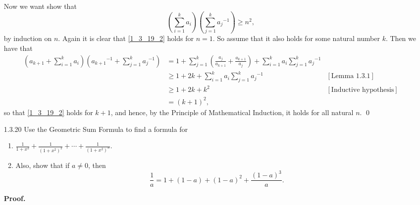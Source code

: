 \begin{enumerate}
      Now we want show that
      \begin{equation}
         \left(\sum_{i = 1}^ka_i\right)
         \left(\sum_{j = 1}^k{a_j}^{-1}\right) \ge n^2, \label{1_3_19_2}
      \end{equation}
      by induction on $n$. Again it is clear that \eqref{1_3_19_2} holds for
      $n = 1$. So assume that it also holds for some natural number $k$. Then
      we have that
      \begin{align*}
         \left(a_{k+1} + \sum_{i = 1}^ka_i\right)
         \left({a_{k+1}}^{-1} + \sum_{j = 1}^k{a_j}^{-1}\right)
            &= 1 + \sum_{j = 1}^k\left(\frac{a_j}{a_{k+1}} +
               \frac{a_{k+1}}{a_j}\right) + \sum_{i = 1}^ka_i
               \sum_{j = 1}^k{a_j}^{-1} \\
            &\ge 1 + 2k + \sum_{i = 1}^ka_i
               \sum_{j = 1}^k{a_j}^{-1} &[\text{Lemma 1.3.1}] \\
            &\ge 1 + 2k + k^2 &[\text{Inductive hypothesis}] \\
            &= (k + 1)^2,
      \end{align*}
      so that \eqref{1_3_19_2} holds for $k + 1$, and hence, by the Principle of
      Mathematical Induction, it holds for all natural $n$. \qed
   \item[1.3.20]  Use the Geometric Sum Formula to find a formula for
                  \begin{enumerate}
                     \item $\displaystyle\frac{1}{1 + x^2} +
                            \frac{1}{(1 + x^2)^2} + \cdots +
                            \frac{1}{(1 + x^2)^n}$.
                     \item Also, show that if $a \neq 0$, then
                           $$\frac{1}{a} = 1 + (1 - a) + (1 - a)^2 +
                             \frac{(1 - a)^3}{a}.$$
                  \end{enumerate}

      \textbf{Proof.}


\end{enumerate}
